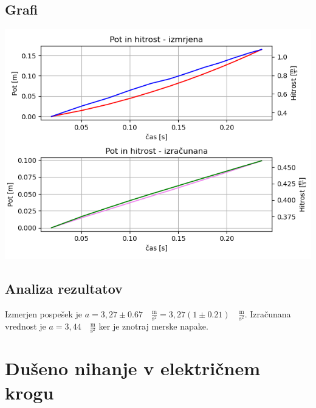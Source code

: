 \documentclass[12pt]{article}
\begin{document}
	\subsection*{Grafi}
	\includegraphics[width=\linewidth]{slike/graf_v5_1.png}

	\subsection*{Analiza rezultatov}
	Izmerjen pospešek je $a = 3,27 \pm 0.67 \quad \frac{\text{m}}{\text{s}^2} = 3,27 (1 \pm 0.21)\quad \frac{\text{m}}{\text{s}^2}$.
	Izračunana vrednost je $ a = 3,44 \quad \frac{\text{m}}{\text{s}^2}$ ker je znotraj 
	merske napake.

\newpage
\section{Dušeno nihanje v električnem krogu}
\end{document}
